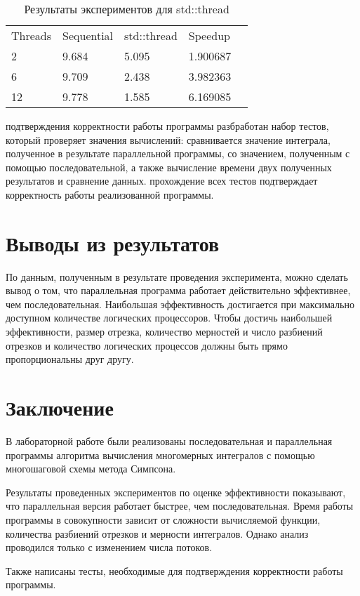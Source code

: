\documentclass{report}
\begin{document}
\begin{table}[!h]
\caption{Результаты экспериментов для std::thread}
\centering
\begin{tabular}{lllll}
Threads & Sequential & std::thread & Speedup  \\
2        & 9.684        & 5.095    & 1.900687       \\
6        & 9.709        & 2.438    & 3.982363       \\
12       & 9.778        & 1.585    & 6.169085       
\end{tabular}
\end{table}
 подтверждения корректности работы программы разбработан набор тестов, который проверяет значения вычислений: сравнивается значение интеграла, полученное в результате параллельной программы, со значением, полученным с помощью последовательной, а также вычисление времени двух полученных результатов и сравнение данных.
 прохождение всех тестов подтверждает корректность работы реализованной программы.
\newpage

\section*{Выводы из результатов}
\par По данным, полученным в результате проведения эксперимента, можно сделать вывод о том, что параллельная программа работает действительно эффективнее, чем последовательная. Наибольшая эффективность достигается при
максимально доступном количестве логических процессоров. Чтобы достичь наибольшей эффективности, размер отрезка, количество мерностей и число разбиений отрезков и количество логических процессов должны быть прямо пропорциональны друг другу.
\newpage

\section*{Заключение}
В лабораторной работе были реализованы последовательная и параллельная программы алгоритма вычисления многомерных интегралов с помощью многошаговой схемы метода Симпсона.
\par Результаты проведенных экспериментов по оценке эффективности показывают, что параллельная версия работает быстрее, чем последовательная. Время работы программы в совокупности зависит от сложности вычисляемой функции, количества разбиений отрезков и мерности интегралов. Однако анализ проводился только с изменением числа потоков.
\par Также написаны тесты, необходимые для подтверждения корректности работы программы.
\newpage
\end{document}
